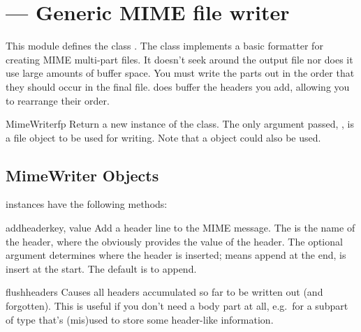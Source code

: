 \section{ ---
         Generic MIME file writer}




This module defines the class .  The
 class implements a basic formatter for creating
MIME multi-part files.  It doesn't seek around the output file nor
does it use large amounts of buffer space. You must write the parts
out in the order that they should occur in the final
file.  does buffer the headers you add, allowing you 
to rearrange their order.

\begin{classdesc}{MimeWriter}{fp}
Return a new instance of the  class.  The only
argument passed, , is a file object to be used for
writing. Note that a  object could also be used.
\end{classdesc}


\subsection{MimeWriter Objects \label{MimeWriter-objects}}


 instances have the following methods:

\begin{methoddesc}[MimeWriter]{addheader}{key, value}
Add a header line to the MIME message. The  is the name of
the header, where the  obviously provides the value of the
header. The optional argument  determines where the header 
is inserted;  means append at the end,  is insert at
the start. The default is to append.
\end{methoddesc}

\begin{methoddesc}[MimeWriter]{flushheaders}{}
Causes all headers accumulated so far to be written out (and
forgotten). This is useful if you don't need a body part at all,
e.g.\ for a subpart of type  that's (mis)used
to store some header-like information.
\end{methoddesc}

